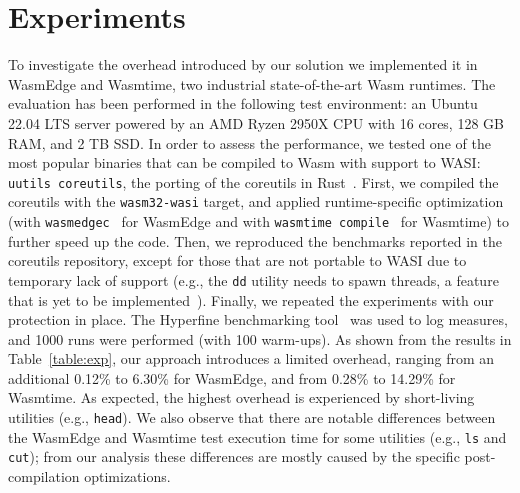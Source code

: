 \section{Experiments \label{sec:exp}}

To investigate the overhead introduced by our solution we implemented
it in WasmEdge and Wasmtime, two industrial state-of-the-art Wasm
runtimes. The evaluation has been performed in the following test
environment: an Ubuntu 22.04 LTS server powered by an AMD Ryzen 2950X
CPU with 16 cores, 128 GB RAM, and 2 TB SSD. %
In order to assess the performance, we tested one of the most popular
binaries that can be compiled to Wasm with support to WASI: {\tt uutils
coreutils}, the porting of the coreutils in Rust~\cite{coreutils-repo}.
First, we compiled the coreutils with the {\tt wasm32-wasi}
target, and applied runtime-specific optimization
(with {\tt wasmedgec}~\cite{wasmedgec} for WasmEdge and with
{\tt wasmtime compile}~\cite{wasmtimecompile} for Wasmtime) to further
speed up the code. Then, we reproduced
the benchmarks reported in the coreutils repository, except for
those that are not portable to WASI due to temporary lack
of support (e.g., the {\tt dd} utility needs to spawn threads, a
feature that is yet to be implemented~\cite{wasi-threads}). Finally, we
repeated the experiments with our protection in place. The Hyperfine
benchmarking tool~\cite{hyperfine} was used to log measures, and 1000
runs were performed (with 100 warm-ups). As shown from the results in Table~\ref{table:exp}, our approach introduces
a limited overhead, ranging from an additional 0.12\% to 6.30\% for
WasmEdge, and from 0.28\% to 14.29\% for Wasmtime. As expected, the
highest overhead is experienced by short-living utilities (e.g.,
{\tt head}). We also observe that there are notable differences
between the WasmEdge and Wasmtime test execution time for some utilities (e.g.,
{\tt ls} and {\tt cut}); from our analysis these differences are
mostly caused by the specific post-compilation optimizations.

